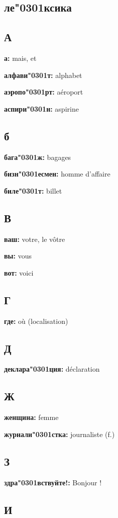 \documentclass[a5paper, 10pt]{article}
\title{\vskip -4em\bf\Huge\headingfont Русский}
\date{}
\newcommand{\лекси}[2]{{\textbf{#1: }{#2}\par}}
\newcommand{\ак}[0]{\char"0301} %
\begin{document}
\maketitle

\begin{multicols}{2}
  \section*{ле\ак ксика}
  \subsection*{А}
  
  \лекси{а}{mais, et}
  \лекси{алфави\ак т}{alphabet}
  \лекси{аэропо\ак рт}{aéroport}
  \лекси{аспири\ак н}{aspirine}

  \subsection*{б}
  \лекси{бага\ак ж}{bagages}
  \лекси{бизн\ак есмен}{homme d'affaire}
  \лекси{биле\ак т}{billet}
    
  \subsection*{В}
  \лекси{ваш}{votre, le vôtre}
  \лекси{вы}{vous}
  \лекси{вот}{voici}

  \subsection*{Г}
  \лекси{где}{où (localisation)}
  
  \subsection*{Д}

  \лекси{деклара\ак ция}{déclaration}

  \subsection*{Ж}
  \лекси{женщина}{femme}
  \лекси{журнали\ак стка}{journaliste (f.)}

  \subsection*{З}
  \лекси{здра\ак вствуйте!}{Bonjour !}

  \subsection*{И}


\end{multicols}
\end{document}

